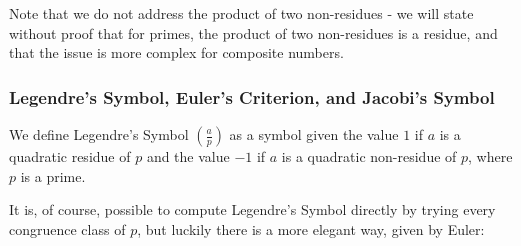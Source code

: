 \documentclass{article}
\begin{document}
 \par Note that we do not address the product of two non-residues - we will state without proof that for primes, the product of two non-residues is a residue, and that the issue is more complex for composite numbers. 
 
 
\subsubsection*{Legendre's Symbol, Euler's Criterion, and Jacobi's Symbol}
We define Legendre's Symbol $\left( \frac{a}{p} \right)$ as a symbol given the value $1$ if $a$ is a quadratic residue of $p$ and the value $-1$ if $a$ is a quadratic non-residue of $p$, where $p$ is a prime.
\par It is, of course, possible to compute Legendre's Symbol directly by trying every congruence class of $p$, but luckily there is a more elegant way, given by Euler:
\end{document}
